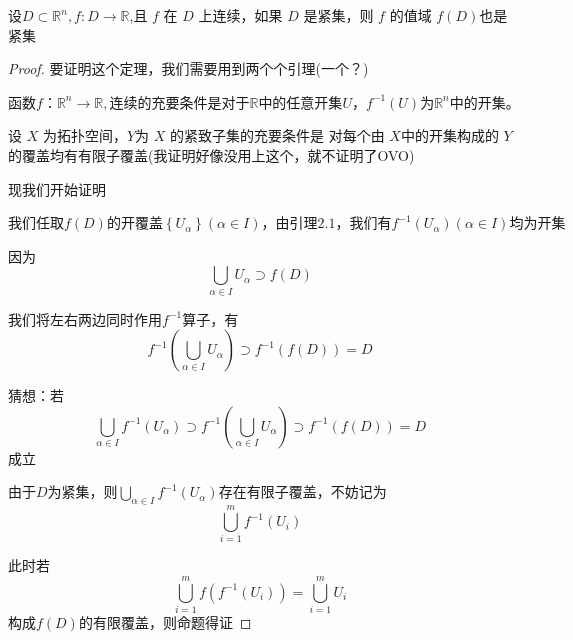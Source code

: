\documentclass[lang=cn,10pt]{elegantbook}
\begin{document}
	\begin{theorem}
		$\text{设}D\subset \mathbb{R} ^n,f:D\rightarrow \mathbb{R}$,且 $f$ 在 $D$ 上连续，如果 $D$
		是紧集，则 $f$ 的值域 $f(D) $也是紧集
	\end{theorem}
	\begin{proof}
		要证明这个定理，我们需要用到两个个引理(一个？)
		\begin{lemma}
			$\text{函数}f\text{：}\mathbb{R} ^n\rightarrow \mathbb{R} ,\text{连续的充要条件是对于}\mathbb{R} \text{中的任意开集}U\text{，}f^{-1}(U)\text{为}\mathbb{R} ^n\text{中的开集。}$
			
		\end{lemma}
		\begin{lemma}
			设 $X$ 为拓扑空间，$Y $为 $X$ 的紧致子集的充要条件是
			对每个由 $X $中的开集构成的 $Y $的覆盖均有有限子覆盖(我证明好像没用上这个，就不证明了OVO)
		\end{lemma}
		
		现我们开始证明
		
		$\text{我们任取}f\left( D \right) \text{的开覆盖}\left\{ U_{\alpha} \right\} \left( \alpha \in I \right) \text{，由引理2.1，我们有}f^{-1}\left( U_{\alpha} \right) \left( \alpha \in I \right) \text{均为开集}
		$
		
		因为
		\begin{equation*}
			\bigcup_{\alpha \in I}{U_{\alpha}}\supset f\left( D \right) 
		\end{equation*}
		
		我们将左右两边同时作用$f^{-1}$算子，有
		\begin{equation*}
			f^{-1}(\bigcup_{\alpha \in I}{U_{\alpha}})\supset f^{-1}(f\left( D \right)) =D
		\end{equation*}
		
		猜想：若
		\begin{equation*}
			\bigcup_{\alpha \in I}{f^{-1}\left( U_{\alpha} \right)}\supset f^{-1}(\bigcup_{\alpha \in I}{U_{\alpha}})\supset f^{-1}(f\left( D \right) )=D
		\end{equation*}
		成立
		
		由于$D$为紧集，则$\bigcup_{\alpha \in I}{f^{-1}\left( U_{\alpha} \right)}
		$存在有限子覆盖，不妨记为
		\begin{equation*}
			\bigcup_{i=1}^m{f^{-1}\left( U_i \right)}
		\end{equation*}
		
		此时若
		\begin{equation*}
			\bigcup_{i=1}^m{f(f^{-1}\left( U_i \right))}=\bigcup_{i=1}^m{U_i}
		\end{equation*}
		构成$f(D)$的有限覆盖，则命题得证
		

\end{proof}
\end{document}
